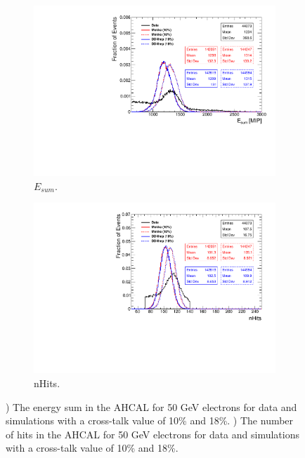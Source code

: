 \begin{figure}[htbp!]
  \centering
  \begin{subfigure}[t]{0.49\textwidth}
    \includegraphics[width=1.\linewidth]{../Thesis_Plots/Timing/Electrons/Plots/Comparison_EnergySum_Xtalk_electrons50GeV.pdf}
    \caption{$E_{sum}$.} \label{fig:e50Evis}
  \end{subfigure}
  \hfill
  \begin{subfigure}[t]{0.49\textwidth}
    \includegraphics[width=1.\linewidth]{../Thesis_Plots/Timing/Electrons/Plots/Comparison_nHits_Xtalk_electrons50GeV.pdf}
    \caption{nHits.} \label{fig:e50nHits}
  \end{subfigure}
  \caption{) The energy sum in the AHCAL for 50 GeV electrons for data and simulations with a cross-talk value of 10\% and 18\%. ) The number of hits in the AHCAL for 50 GeV electrons for data and simulations with a cross-talk value of 10\% and 18\%.}
  \label{fig:e50Val}
\end{figure}

